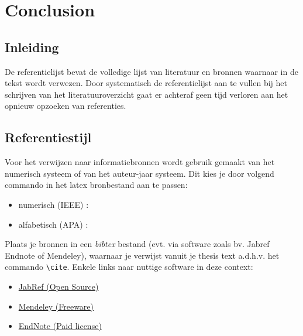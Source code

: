 \chapter{Conclusion}

\section{Inleiding}
De referentielijst bevat de volledige lijst van literatuur en bronnen waarnaar in de tekst wordt verwezen. Door systematisch de referentielijst aan te vullen bij het schrijven van het literatuuroverzicht gaat er achteraf geen tijd verloren aan het opnieuw opzoeken van referenties.

\section{Referentiestijl}

Voor het verwijzen naar informatiebronnen wordt gebruik gemaakt van het numerisch systeem  of van het auteur-jaar systeem. Dit kies je door volgend commando in het latex bronbestand aan te passen:

\begin{itemize}
	\item numerisch (IEEE) : \verb||
	\item alfabetisch (APA) : \verb||
\end{itemize}

Plaats je bronnen in een \textit{bibtex} bestand (evt. via software zoals bv. Jabref Endnote of Mendeley), waarnaar je verwijst vanuit je thesis text a.d.h.v. het commando \verb|\cite|. Enkele links naar nuttige software in deze context:

\begin{itemize}
	\item \href{http://www.jabref.org/}{JabRef (Open Source)}
	\item \href{http://www.mendeley.com}{Mendeley (Freeware)}
	\item \href{http://www.endnote.com}{EndNote (Paid license)}
\end{itemize}

